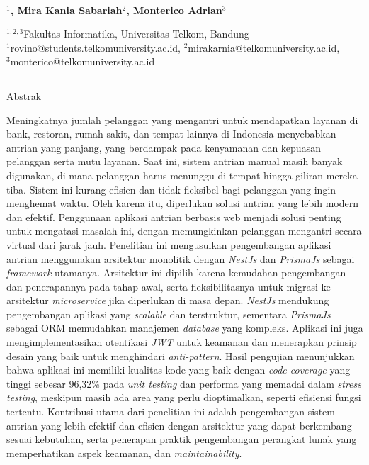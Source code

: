 
  \begin{center}
      \textbf{\large \Title}\\
      \bigskip 
  \end{center}
  
  
  
  \begin{center}
    \bf \Author$^1$, Mira Kania Sabariah$^2$, Monterico Adrian$^3$
  \end{center}
  
  
  \begin{center}
    $^{1,2,3}$Fakultas Informatika, Universitas Telkom, Bandung\\
$^1$rovino@students.telkomuniversity.ac.id, $^2$mirakarnia@telkomuniversity.ac.id,\\ $^3$monterico@telkomuniversity.ac.id
  \end{center}
  
  
  \newpage
{\bf \parindent0pt \noindent\rule{\textwidth}{1pt}}
Abstrak

Meningkatnya jumlah pelanggan yang mengantri untuk mendapatkan layanan di bank, restoran, rumah sakit, dan tempat lainnya di Indonesia menyebabkan antrian yang panjang, yang berdampak pada kenyamanan dan kepuasan pelanggan serta mutu layanan. Saat ini, sistem antrian manual masih banyak digunakan, di mana pelanggan harus menunggu di tempat hingga giliran mereka tiba. Sistem ini kurang efisien dan tidak fleksibel bagi pelanggan yang ingin menghemat waktu. Oleh karena itu, diperlukan solusi antrian yang lebih modern dan efektif. Penggunaan aplikasi antrian berbasis web menjadi solusi penting untuk mengatasi masalah ini, dengan memungkinkan pelanggan mengantri secara virtual dari jarak jauh. Penelitian ini mengusulkan pengembangan aplikasi antrian menggunakan arsitektur monolitik dengan \textit{NestJs} dan \textit{PrismaJs} sebagai \textit{framework} utamanya. Arsitektur ini dipilih karena kemudahan pengembangan dan penerapannya pada tahap awal, serta fleksibilitasnya untuk migrasi ke arsitektur \textit{microservice} jika diperlukan di masa depan. \textit{NestJs} mendukung pengembangan aplikasi yang \textit{scalable} dan terstruktur, sementara \textit{PrismaJs} sebagai ORM memudahkan manajemen \textit{database} yang kompleks. Aplikasi ini juga mengimplementasikan otentikasi \textit{JWT} untuk keamanan dan menerapkan prinsip desain yang baik untuk menghindari \textit{anti-pattern}. Hasil pengujian menunjukkan bahwa aplikasi ini memiliki kualitas kode yang baik dengan \textit{code coverage} yang tinggi sebesar 96,32\% pada \textit{unit testing} dan performa yang memadai dalam \textit{stress testing}, meskipun masih ada area yang perlu dioptimalkan, seperti efisiensi fungsi tertentu. Kontribusi utama dari penelitian ini adalah pengembangan sistem antrian yang lebih efektif dan efisien dengan arsitektur yang dapat berkembang sesuai kebutuhan, serta penerapan praktik pengembangan perangkat lunak yang memperhatikan aspek keamanan, dan \textit{maintainability}.

